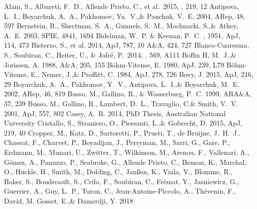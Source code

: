 \documentclass[a4paper,fleqn,usenatbib]{mnras}
\begin{document}
\begin{thebibliography}{99}
 Alam, S., Albareti, F.~D., Allende Prieto, C., et al.\ 2015, \apjs, 219, 12 
Antipova, L.~I., Boyarchuk, A.~A., Pakhomov, Yu.~V.,\& Panchuk, V.~E. 2004, 
ARep, 48, 597
Bernstein, R., Shectman, S.~A., Gunnels, S.~M., Mochnacki, S.,\& Athey, A.~E. 2003, 
SPIE, 4841, 1694    
Bidelman, W.~P. \& Keenan, P.~C. , 1951, ApJ, 114, 473
Bisterzo, S., et al. 2014, 
ApJ, 787, 10
A$\&$A, 424, 727
 Blanco-Cuaresma, S., Soubiran, C., Heiter, U., \& Jofr{\'e}, P.\ 2014, \aap, 569, A111 
Boffin H, M.~J.,\& Jorissen, A. 1988, 
A$\&$A, 205, 155
B\"ohm-Vitense, E. 1980, 
ApJ, 239, L79
B\"ohm-Vitense, E., Nemec, J.,\& Proffitt, C. 1984, 
ApJ, 278, 726
Bovy, J. 2015, 
ApJ, 216, 29
Boyarchuk, A.~A., Pakhomov, Y.~V., Antipova, L.~I.,\& Boyarchuk, M.~E. 2002, 
ARep, 46, 819
Busso, M., Gallino, R., \& Wasserburg, P.~C. 1999, 
ARA$\&$A, 37, 239
Busso, M., Gallino, R., Lambert, D.~L., Travaglio, C.\& Smith, V.~V. 2001, 
ApJ, 557, 802
Casey, A.~R. 2014, 
PhD Thesis, Australian National University
Cristallo, S., Straniero, O., Piersanti, L.,\& Gobrecht, D. 2015, 
ApJ, 219, 40
Cropper, M., Katz, D., Sartoretti, P., Prusti, T., de Bruijne, J.~H.~J., Chassat, F., Charvet, P., Boyadijan, J., Perryman, M., Sarri, G., Gare, P., Erdmann, M., Munari, U., Zwitter, T., Wilkinson, M., Arenou, F., Vallenari, A., G{\'o}mez, A., Panuzzo, P., Seabroke, G., Allende Prieto, C., Benson, K., Marchal, O., Huckle, H., Smith, M., Dolding, C., Jan{\ss}en, K., Viala, Y., Blomme, R., Baker, S., Boudreault, S., Crifo, F., Soubiran, C., Fr{\'e}mat, Y., Jasniewicz, G., Guerrier, A., Guy, L.~P., Turon, C., Jean-Antoine-Piccolo, A., Th{\'e}venin, F., David, M. Gosset, E.,\& Damerdji, Y. 2018

\end{thebibliography}
\end{document}
